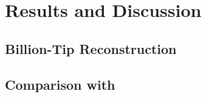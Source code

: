 \section{Results and Discussion} \label{sec:results}

\subsection{Billion-Tip Reconstruction}

\subsection{Comparison with }